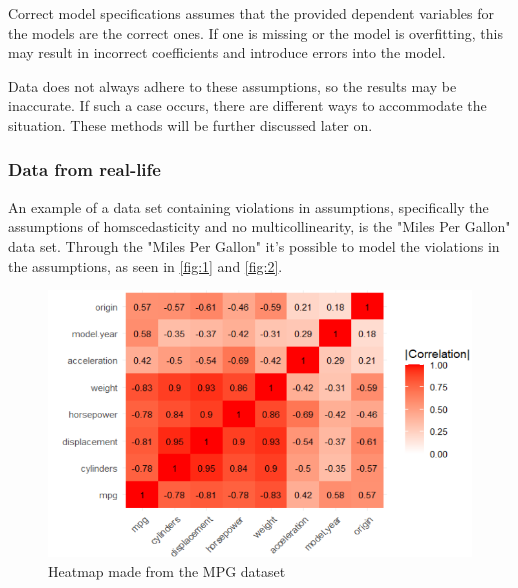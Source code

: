 \noindent Correct model specifications assumes that the provided dependent variables for the models are the correct ones. If one is missing or the model is overfitting, this may result in incorrect coefficients and introduce errors into the model. \newline

\noindent Data does not always adhere to these assumptions, so the results may be inaccurate. 
If such a case occurs, there are different ways to accommodate the situation. These methods will be further discussed later on. \newline 

 

\subsubsection{Data from real-life}
An example of a data set containing violations in assumptions, specifically the assumptions of homscedasticity and no multicollinearity, is the "Miles Per Gallon" data set. Through the "Miles Per Gallon" it's possible to model the violations in the assumptions, as seen in \autoref{fig:1} and \autoref{fig:2}.
\newline

\begin{figure}
	\centering
	\centering
	\includegraphics{billder/1.png}
	\caption{Heatmap made from the MPG dataset}
	\label{fig:1}
\end{figure}


